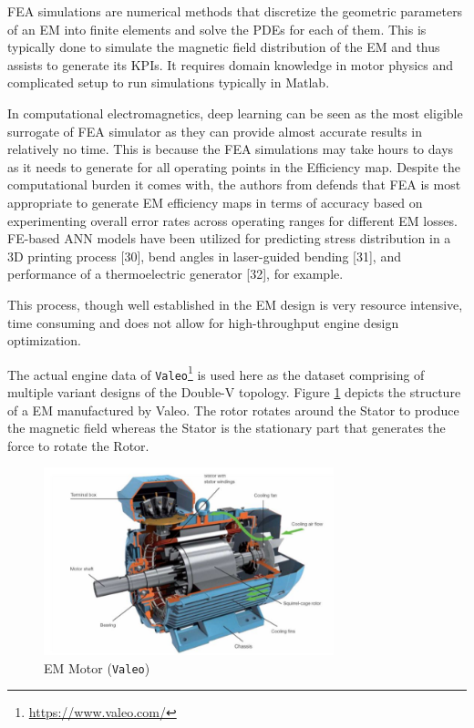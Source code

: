 \documentclass{report} %
\begin{document}
\ac{FEA} simulations are numerical methods that discretize the geometric parameters of an \ac{EM} into finite elements and solve the \ac{PDE}s for each of them.
This is typically done to simulate the magnetic field distribution of the \ac{EM} and thus assists to generate its \ac{KPI}s.  
It requires domain knowledge in motor physics and complicated setup to run simulations typically in Matlab.

In computational electromagnetics, deep learning can be seen as the most eligible surrogate of \ac{FEA} simulator as they can
provide almost accurate results in relatively no time. 
This is because the \ac{FEA} simulations may take hours to days as it needs to generate for all operating points in the Efficiency map.
Despite the computational burden it comes with, the authors from \cite{FEA-ETA-2017} defends that \ac{FEA} is most appropriate to 
generate \ac{EM} efficiency maps in terms of accuracy based on experimenting overall error rates across operating ranges for different \ac{EM} losses.
FE-based \ac{ANN} models have been utilized for predicting stress distribution in a 3D printing process [30], bend angles in laser-guided bending [31], 
and performance of a thermoelectric generator [32], for example.\cite{SM EMT-2020}

This process, though well established in the \ac{EM} design is very resource intensive, time consuming and does not allow for high-throughput engine design optimization. 

The actual engine data of \texttt{Valeo}\footnote{\url{https://www.valeo.com/}} is used here as the dataset comprising of multiple variant designs of the Double-V topology.
Figure \ref{fig:Valeo Motor Structure} depicts the structure of a \ac{EM} manufactured by Valeo. 
The rotor rotates around the Stator to produce the magnetic field whereas the Stator is the stationary part that generates the force to rotate the Rotor.         
\begin{figure}[H]
    \centering
    \includegraphics[width=0.75\textwidth]{./ReportImages/ValeoMotorStructure.jpg} 
    \caption{\ac{EM} Motor (\texttt{Valeo})}
    \label{fig:Valeo Motor Structure}
\end{figure}
\end{document}
